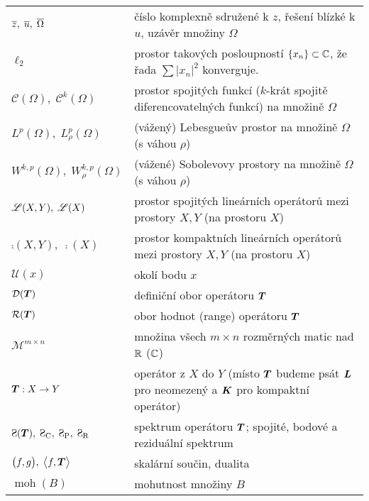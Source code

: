 
\begin{table}[h!]
\begin{tabular}{l|l}
$\overline{z}, \; \overline{u}, \; \overline{\Omega}$
& číslo komplexně sdružené k $z$, řešení blízké k $u$, uzávěr množiny $\Omega$
\\
$\ell_2$ & prostor takových posloupností $\{ x_n \} \subset \mathbb{C}$, že řada $\sum |x_n|^2$ konverguje.
\\
$\mathcal{C}(\Omega), \; \mathcal{C}^k(\Omega)$
& prostor spojitých funkcí ($k$-krát spojitě diferencovatelných funkcí) na množině $\Omega$
\\
$L^p(\Omega), \; L^p_\rho(\Omega)$
& (vážený) Lebesgueův prostor na množině $\Omega$ (s váhou $\rho$)
\\
$W^{k,p}(\Omega), \; W^{k,p}_\rho(\Omega)$
& (vážené) Sobolevovy prostory na množině $\Omega$ (s váhou $\rho$)
\\
$\mathscr{L}(X, Y), \; \mathscr{L}(X)$
& prostor spojitých lineárních operátorů mezi prostory $X, Y$ (na prostoru $X$)
\\
$\comp(X, Y), \; \comp(X)$
& prostor kompaktních lineárních operátorů mezi prostory $X, Y$ (na prostoru $X$)
\\
$\mathcal{U}(x)$
& okolí bodu $x$
\\
$\mathcal{D}(\boldsymbol{T})$
& definiční obor operátoru $\boldsymbol{T}$
\\
$\mathcal{R}(\boldsymbol{T})$
& obor hodnot (range) operátoru $\boldsymbol{T}$
\\
$\mathcal{M}^{m \times n}$
& množina všech $m\times n$ rozměrných matic nad $\mathbb{R}$ ($\mathbb{C}$)
\\
$\boldsymbol{T}: X \to Y$
& operátor z $X$ do $Y$ (místo $\boldsymbol{T}$ budeme psát $\boldsymbol{L}$ pro neomezený a $\boldsymbol{K}$ pro kompaktní operátor)
\\
$\Sp(\map T), \; \SpC, \; \SpP, \; \SpR$
& spektrum operátoru $\boldsymbol{T}$; spojité, bodové a reziduální spektrum
\\
$\big( f, g \big), \; \big< f, \boldsymbol{T} \big>$
& skalární součin, dualita \\
$\operatorname{moh}(B)$
& mohutnost množiny $B$ \\

\end{tabular}
\end{table}